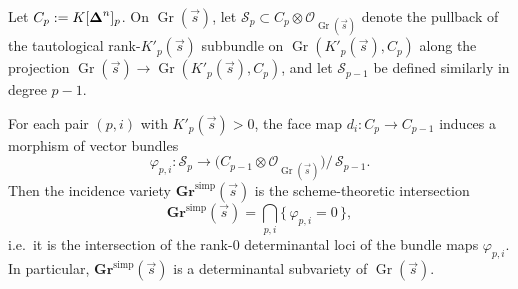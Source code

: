 \begin{proposition}\label{prop:determinantal}
Let $C_p := K[\boldsymbol{\Delta}^n]_p$. On $\operatorname{Gr}(\vec s)$, let
$\mathcal{S}_p \subset C_p \otimes \mathcal{O}_{\operatorname{Gr}(\vec s)}$
denote the pullback of the tautological rank-$K'_p(\vec s)$ subbundle on
$\operatorname{Gr}(K'_p(\vec s),C_p)$ along the projection
$\operatorname{Gr}(\vec s) \to \operatorname{Gr}(K'_p(\vec s),C_p)$, and
let $\mathcal{S}_{p-1}$ be defined similarly in degree $p-1$.

For each pair $(p,i)$ with $K'_p(\vec s)>0$, the face map
$d_i : C_p \to C_{p-1}$ induces a morphism of vector bundles
\[
\varphi_{p,i} : \mathcal{S}_p \longrightarrow
 \bigl(C_{p-1} \otimes \mathcal{O}_{\operatorname{Gr}(\vec s)}\bigr)
/\,\mathcal{S}_{p-1}.
\]
Then the incidence variety $\mathbf{Gr}^{\mathrm{simp}}(\vec s)$ is the
scheme-theoretic intersection
\[
\mathbf{Gr}^{\mathrm{simp}}(\vec s)
 = \bigcap_{p,i} \{\,\varphi_{p,i} = 0\,\},
\]
i.e.\ it is the intersection of the rank-$0$ determinantal loci of the
bundle maps $\varphi_{p,i}$. In particular, $\mathbf{Gr}^{\mathrm{simp}}(\vec s)$
is a determinantal subvariety of $\operatorname{Gr}(\vec s)$.
\end{proposition}

